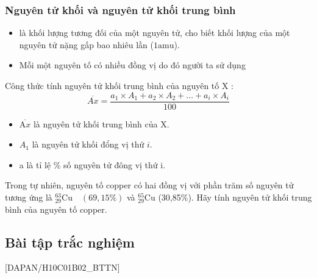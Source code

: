 \subsubsection{Nguyên tử khối và nguyên tử khối trung bình}
\begin{kngsnd}
	\begin{itemize}
		\item {} là khối lượng tương đối của một nguyên tử, cho biết khối lượng của một nguyên tử nặng gấp bao nhiêu lần  ($1\mathrm{amu} $).
		\item Mỗi một nguyên tố có nhiều đồng vị do đó người ta sử dụng 
	\end{itemize}
\end{kngsnd}
\begin{hoplythuyet}
	Công thức tính nguyên tử khối trung bình của nguyên tố $\mathrm{X}$ :
	$$
	\overline{A x}=\frac{a_1 \times A_1+a_2 \times A_2+\ldots+a_i \times A_i}{100}
	$$
	\begin{itemize}
\item $\overline{\mathrm{A} x}$ là nguyên tử khối trung bình của $\mathrm{X}$.
\item $A_1$ là nguyên tử khối đổng vị thứ $i$.
\item a là tỉ lệ \% số nguyên tử đông vị thứ i.
	\end{itemize}
\end{hoplythuyet}
\begin{hoivadap}
	Trong tự nhiên, nguyên tố copper có hai đồng vị với phần trăm số nguyên tử tương ứng
	là ${ }_{29}^{63} \mathrm{Cu} \quad(69,15 \%)$ và ${ }_{29}^{65} \mathrm{Cu}$
	(30,85\%). Hãy tính nguyên tử
	khối trung bình của nguyên tố copper.
\end{hoivadap}

\subsection{Bài tập trắc nghiệm}

[DAPAN/H10C01B02_BTTN]

